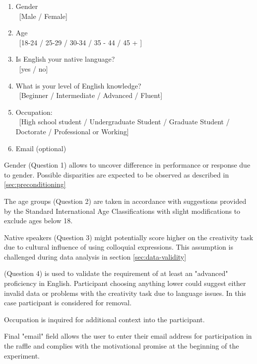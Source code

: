	\begin{enumerate}
		\item Gender \\ \ [Male / Female]
		\item Age \\ \ [18-24 / 25-29 / 30-34 / 35 - 44 / 45 + ]
		\item Is English your native language? \\ \ [yes / no]
		\item What is your level of English knowledge? \\ \
			[Beginner  / Intermediate / Advanced / Fluent]
		\item Occupation: \\ \ [High school student / Undergraduate Student / Graduate Student / Doctorate / Professional or Working]
		\item Email (optional)
	\end{enumerate}

	Gender (Question 1) allows to uncover difference in performance or response due to gender. Possible disparities are expected to be observed as described in \ref{sec:preconditioning}

	The age groups (Question 2) are taken in accordance with suggestions provided by the Standard International Age Classifications \cite{UN1982} with slight modifications to exclude ages below 18.
	
	
	Native speakers (Question 3) might potentially score higher on the creativity task due to cultural influence of using colloquial expressions. This assumption is challenged during data analysis in section \ref{sec:data-validity}
	
	(Question 4) is used to validate the requirement of at least an "advanced" proficiency in English. Participant choosing anything lower could suggest either invalid data or problems with the creativity task due to language issues. In this case participant is considered for removal. 
	
	Occupation is inquired for additional context into the participant.
	
	Final "email" field allows the user to enter their email address for participation in the raffle and complies with the motivational promise at the beginning of the experiment.


